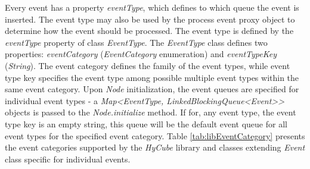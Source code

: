 Every event has a property \emph{eventType}, which defines to which queue the event is inserted. The event type may also be used by the process event proxy object to determine how the event should be processed. The event type is defined by the \emph{eventType} property of class \emph{EventType}. The \emph{EventType} class defines two properties: \emph{eventCategory} (\emph{EventCategory} enumeration) and \emph{eventTypeKey} (\emph{String}). The event category defines the family of the event types, while event type key specifies the event type among possible multiple event types within the same event category. Upon \emph{Node} initialization, the event queues are specified for individual event types - a \emph{Map<EventType, LinkedBlockingQueue<Event>>} objects is passed to the \emph{Node.initialize} method. If for, any event type, the event type key is an empty string, this queue will be the default event queue for all event types for the specified event category. Table \ref{tab:libEventCategory} presents the event categories supported by the \emph{HyCube} library and classes extending \emph{Event} class specific for individual events.

